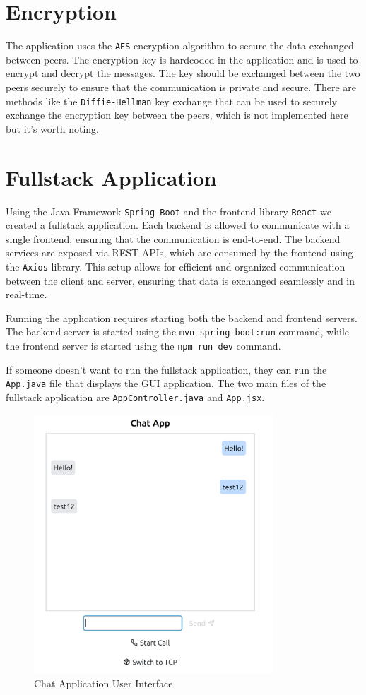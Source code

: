 \documentclass{article}
\begin{document}
\section{Encryption}
The application uses the \texttt{AES} encryption algorithm to secure the data exchanged between peers. The encryption key is hardcoded
in the application and is used to encrypt and decrypt the messages. The key should be exchanged between the two peers securely to ensure
that the communication is private and secure. There are methods like the \texttt{Diffie-Hellman} key exchange that can be used to securely
exchange the encryption key between the peers, which is not implemented here but it's worth noting.

\section{Fullstack Application}
Using the Java Framework \texttt{Spring Boot} and the frontend library \texttt{React} we created a fullstack application.
Each backend is allowed to communicate with a single frontend, ensuring that the communication is end-to-end.
The backend services are exposed via REST APIs, which are consumed by the frontend using the \texttt{Axios} library. 
This setup allows for efficient and organized communication between the client and server, ensuring that data is 
exchanged seamlessly and in real-time.

Running the application requires starting both the backend and frontend servers. The backend server is started using the
\texttt{mvn spring-boot:run} command, while the frontend server is started using the \texttt{npm run dev} command.

If someone doesn't want to run the fullstack application, they can run the \texttt{App.java} file that displays the GUI application.
The two main files of the fullstack application are \texttt{AppController.java} and \texttt{App.jsx}.

\begin{figure}[h]
    \centering
    \includegraphics[width=0.8\textwidth]{chat1.png}
    \caption{Chat Application User Interface}
    \label{fig:chat1}
\end{figure}
\end{document}
